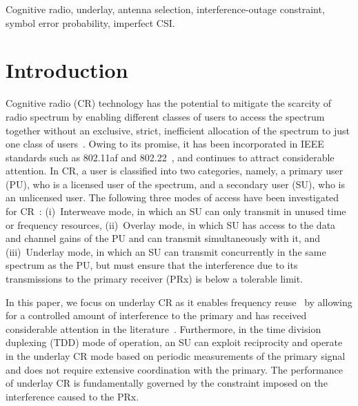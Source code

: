 \documentclass[12pt,draftcls,peerreview,onecolumn]{IEEEtran}
\begin{document}
\begin{IEEEkeywords}
Cognitive radio, underlay, antenna selection, interference-outage constraint, symbol error probability, imperfect CSI.
\end{IEEEkeywords}

\IEEEpeerreviewmaketitle



\section{Introduction}	
\label{sec:intro}

Cognitive radio (CR) technology has the potential to mitigate the scarcity of radio spectrum by enabling different classes of users to access the spectrum together without an exclusive, strict, inefficient allocation of the spectrum to just one class of users~\cite{Goldsmith_2009_PIEEE}. Owing to its promise, it has been incorporated in IEEE standards such as 802.11af and 802.22~\cite{Sherman_2008_TCMAG}, and continues to attract considerable attention. In CR, a user is classified into two categories, namely, a  primary user (PU), who is a licensed user of the spectrum, and a secondary user (SU), who is an unlicensed user. The following three modes of access have been investigated for CR~\cite{Goldsmith_2009_PIEEE}: (i)~Interweave mode, in which an SU can only transmit in unused time or frequency resources, (ii)~Overlay mode, in which SU has access to the data and channel gains of the  PU and can transmit simultaneously with it, and (iii)~Underlay mode, in which an SU can transmit concurrently in the same spectrum as the PU, but must ensure that the interference due to its transmissions to the primary receiver (PRx) is below a tolerable limit. 

In this paper, we focus on underlay CR as it enables frequency reuse~\cite{Zhang_2017_tcom} by allowing for a controlled amount of interference to the primary and has received considerable attention in the literature~\cite{Hanif_2015_globecom,Wang_2010_TWC, RZhang_2009_TWC,Sarvendranath_2013_TCOM,Wang_2011_TCom, Kashyap_2014_TCOM,Sarvendranath_2014_TCOM,Rezki_2012_ieeeVt,Kong_2011_JCN}. Furthermore, in the time division duplexing (TDD) mode of operation, an SU can exploit reciprocity and operate in the underlay CR mode based on periodic measurements of the primary signal and does not require extensive coordination with the primary. The performance of underlay CR is fundamentally governed by the constraint imposed on the interference caused to the PRx. 
\end{document}
